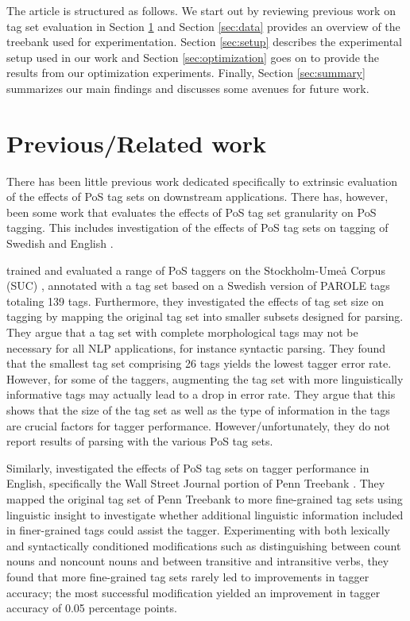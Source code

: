 \documentclass[11pt,a4paper]{article}
\begin{document}
The article is structured as follows. We start out by reviewing
previous work on tag set evaluation in Section \ref{sec:prev} and
Section \ref{sec:data} provides an overview of the treebank used for
experimentation. Section \ref{sec:setup} describes the experimental
setup used in our work and Section \ref{sec:optimization} goes on to
provide the results from our optimization experiments. Finally,
Section \ref{sec:summary} summarizes our main findings and discusses
some avenues for future work.

\section{Previous/Related work}
\label{sec:prev}
There has been little previous work dedicated specifically to
extrinsic evaluation of the effects of PoS tag sets on downstream
applications.  There has, however, been some work that evaluates the
effects of PoS tag set granularity on PoS tagging. This includes
investigation of the effects of PoS tag sets on tagging of Swedish
\cite{Meg:01,Meg:02} and English \cite{Mac:05}.


\cite{Meg:01,Meg:02} trained and evaluated a range of PoS taggers on the
Stockholm-Umeå Corpus (SUC) \cite{Gus:Har:06}, annotated with a tag set based
on a Swedish version of PAROLE tags totaling 139 tags. Furthermore, they
investigated the effects of tag set size on tagging by mapping the original tag
set into smaller subsets designed for parsing. They argue that a tag set with
complete morphological tags may not be necessary for all NLP applications, for
instance syntactic parsing. They found that the smallest tag set comprising 26
tags yields the lowest tagger error rate. However, for some of the taggers,
augmenting the tag set with more linguistically informative tags may actually
lead to a drop in error rate. They argue that this shows that the size of the
tag set as well as the type of information in the tags are crucial factors for
tagger performance. However/unfortunately, they do not report results of
parsing with the various PoS tag sets.

Similarly,  investigated the effects of PoS tag sets on tagger
performance in English, specifically the Wall Street Journal portion of Penn
Treebank \cite{Mar:San:Mar:93}. They mapped the original tag set of Penn
Treebank to more fine-grained tag sets using linguistic insight to investigate
whether additional linguistic information included in finer-grained tags could
assist the tagger. Experimenting with both lexically and syntactically
conditioned modifications such as distinguishing between count nouns and
noncount nouns and between transitive and intransitive verbs, they found that
more fine-grained tag sets rarely led to improvements in tagger accuracy; the
most successful modification yielded an improvement in tagger accuracy of 0.05
percentage points.
\end{document}
